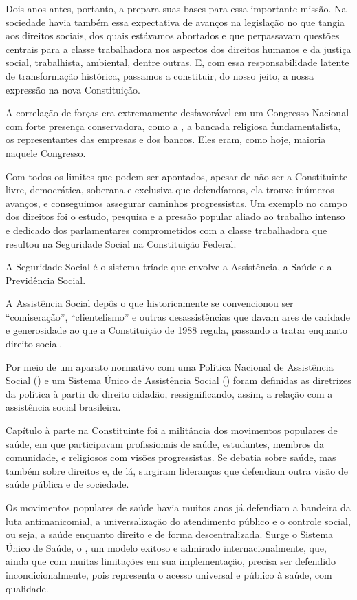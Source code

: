 Dois anos antes, portanto, a  prepara suas bases para essa
importante missão. Na sociedade havia também essa expectativa de avanços
na legislação no que tangia aos direitos sociais, dos quais estávamos
abortados e que perpassavam questões centrais para a classe trabalhadora
nos aspectos dos direitos humanos e da justiça social, trabalhista,
ambiental, dentre outras. E, com essa responsabilidade latente de
transformação histórica, passamos a constituir, do nosso jeito, a nossa
expressão na nova Constituição.

A correlação de forças era extremamente desfavorável em um Congresso
Nacional com forte presença conservadora, como a , a bancada
religiosa fundamentalista, os representantes das empresas e dos bancos.
Eles eram, como hoje, maioria naquele Congresso.

Com todos os limites que podem ser apontados, apesar de não ser a
Constituinte livre, democrática, soberana e exclusiva que defendíamos,
ela trouxe inúmeros avanços, e conseguimos assegurar caminhos
progressistas. Um exemplo no campo dos direitos foi o
estudo, pesquisa e a pressão popular aliado ao trabalho intenso e
dedicado dos parlamentares comprometidos com a classe trabalhadora que
resultou na Seguridade Social na Constituição Federal.

A Seguridade Social é o sistema tríade que envolve a Assistência, a
Saúde e a Previdência Social.

A Assistência Social depôs o que historicamente se convencionou ser
``comiseração'', ``clientelismo'' e outras desassistências que davam
ares de caridade e generosidade ao que a Constituição de 1988 regula,
passando a tratar enquanto direito social.

Por meio de um aparato normativo com uma Política Nacional de
Assistência Social () e um Sistema Único de Assistência Social
() foram definidas as diretrizes da política à partir do direito
cidadão, ressignificando, assim, a relação com a assistência social
brasileira.

Capítulo à parte na Constituinte foi a militância dos movimentos
populares de saúde, em que participavam profissionais de saúde,
estudantes, membros da comunidade, e religiosos com visões progressistas.
Se debatia sobre saúde, mas também sobre direitos e, de lá, surgiram
lideranças que defendiam outra visão de saúde pública e de sociedade.

Os movimentos populares de saúde havia muitos anos já defendiam a
bandeira da luta antimanicomial, a universalização do atendimento
público e o controle social, ou seja, a saúde enquanto direito e de
forma descentralizada. Surge o Sistema Único de Saúde, o , um
modelo exitoso e admirado internacionalmente, que, ainda que com muitas
limitações em sua implementação, precisa ser defendido
incondicionalmente, pois representa o acesso universal e público à
saúde, com qualidade.


